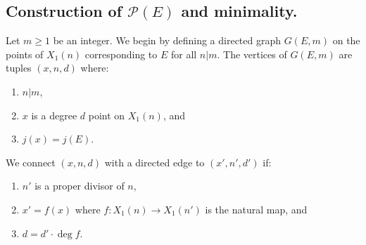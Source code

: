 \documentclass[11pt,reqno]{amsart}
\theoremstyle{plain}
\theoremstyle{definition}
\newcommand{\Q}{\bQ}
\newcommand{\abbey}[1]{\textcolor{blue}{Abbey: #1}}
\newcommand{\abedit}[1]{{\color{blue} #1}}
\begin{document}

\subsection{\texorpdfstring{Construction of $\mathcal{P}(E)$ and minimality.}{Construction of P(E) and minimality}} Let $m\geq 1$ be an integer.
We begin by defining a directed graph $G(E,m)$ on the points of $X_1(n)$ corresponding to $E$ for all $n|m$. The vertices of $G(E,m)$ are tuples $(x,n,d)$ where:
\begin{enumerate}
    \item $n|m$,
    \item $x$ is a degree $d$ point on $X_1(n)$, and
    \item $j(x)=j(E)$.
\end{enumerate}
We connect $(x,n,d)$ with a directed edge to $(x',n',d')$ if:
\begin{enumerate}
    \item $n'$ is a proper divisor of $n$,
    \item $x'=f(x)$ where $f\colon X_1(n)\to X_1(n')$ is the natural map, and
    \item $d=d'\cdot \deg f$.
\end{enumerate}
\end{document}
